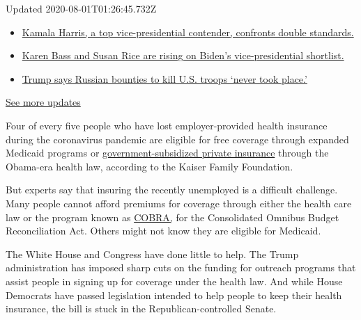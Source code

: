 Updated 2020-08-01T01:26:45.732Z

\begin{itemize}
\tightlist
\item
  \href{https://www.nytimes3xbfgragh.onion/2020/07/31/us/elections/biden-vs-trump.html?action=click\&pgtype=Article\&state=default\&region=MAIN_CONTENT_1\&context=storylines_live_updates\#link-29fdff45}{Kamala
  Harris, a top vice-presidential contender, confronts double
  standards.}
\item
  \href{https://www.nytimes3xbfgragh.onion/2020/07/31/us/elections/biden-vs-trump.html?action=click\&pgtype=Article\&state=default\&region=MAIN_CONTENT_1\&context=storylines_live_updates\#link-13ec3d9c}{Karen
  Bass and Susan Rice are rising on Biden's vice-presidential
  shortlist.}
\item
  \href{https://www.nytimes3xbfgragh.onion/2020/07/31/us/elections/biden-vs-trump.html?action=click\&pgtype=Article\&state=default\&region=MAIN_CONTENT_1\&context=storylines_live_updates\#link-49e9a016}{Trump
  says Russian bounties to kill U.S. troops `never took place.'}
\end{itemize}

\href{https://www.nytimes3xbfgragh.onion/2020/07/31/us/elections/biden-vs-trump.html?action=click\&pgtype=Article\&state=default\&region=MAIN_CONTENT_1\&context=storylines_live_updates}{See
more updates}

Four of every five people who have lost employer-provided health
insurance during the coronavirus pandemic are eligible for free coverage
through expanded Medicaid programs or
\href{https://www.kff.org/health-reform/issue-brief/explaining-health-care-reform-questions-about-health/}{government-subsidized
private insurance} through the Obama-era health law, according to the
Kaiser Family Foundation.

But experts say that insuring the recently unemployed is a difficult
challenge. Many people cannot afford premiums for coverage through
either the health care law or the program known as
\href{http://www.dol.gov/dol/topic/health-plans/cobra.htm}{COBRA,} for
the Consolidated Omnibus Budget Reconciliation Act. Others might not
know they are eligible for Medicaid.

The White House and Congress have done little to help. The Trump
administration has imposed sharp cuts on the funding for outreach
programs that assist people in signing up for coverage under the health
law. And while House Democrats have passed legislation intended to help
people to keep their health insurance, the bill is stuck in the
Republican-controlled Senate.

